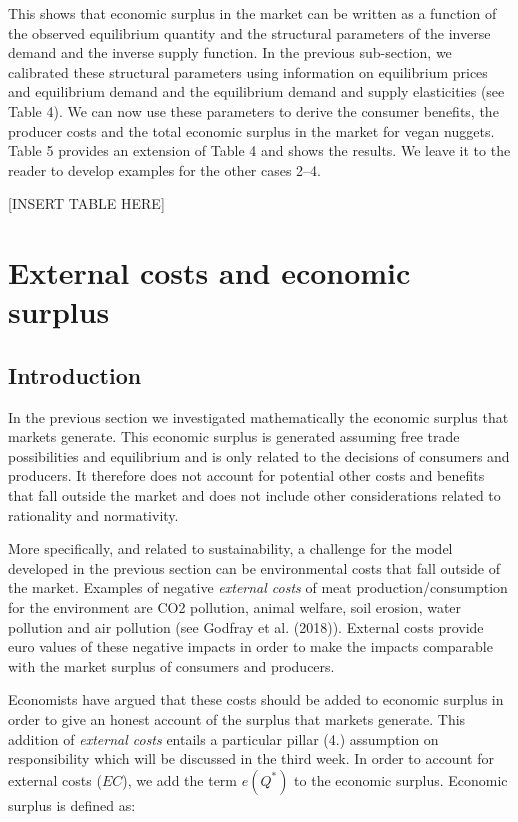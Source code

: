 \documentclass[
]{book}
\begin{document}
This shows that economic surplus in the market can be written as a function of the observed equilibrium quantity and the structural parameters of the inverse demand and the inverse supply function. In the previous sub-section, we calibrated these structural parameters using information on equilibrium prices and equilibrium demand and the equilibrium demand and supply elasticities (see Table 4). We can now use these parameters to derive the consumer benefits, the producer costs and the total economic surplus in the market for vegan nuggets. Table 5 provides an extension of Table 4 and shows the results. We leave it to the reader to develop examples for the other cases 2--4.

{[}INSERT TABLE HERE{]}

\hypertarget{external-costs-and-economic-surplus}{%
\section{External costs and economic surplus}\label{external-costs-and-economic-surplus}}

\hypertarget{introduction-3}{%
\subsection{Introduction}\label{introduction-3}}

In the previous section we investigated mathematically the economic surplus that markets generate. This economic surplus is generated assuming free trade possibilities and equilibrium and is only related to the decisions of consumers and producers. It therefore does not account for potential other costs and benefits that fall outside the market and does not include other considerations related to rationality and normativity.

More specifically, and related to sustainability, a challenge for the model developed in the previous section can be environmental costs that fall outside of the market. Examples of negative \emph{external costs} of meat production/consumption for the environment are CO2 pollution, animal welfare, soil erosion, water pollution and air pollution (see Godfray et al. (2018)). External costs provide euro values of these negative impacts in order to make the impacts comparable with the market surplus of consumers and producers.

Economists have argued that these costs should be added to economic surplus in order to give an honest account of the surplus that markets generate. This addition of \emph{external costs} entails a particular pillar (4.) assumption on responsibility which will be discussed in the third week. In order to account for external costs (\(EC\)), we add the term \(e(Q^\ast)\) to the economic surplus. Economic surplus is defined as:
\end{document}
